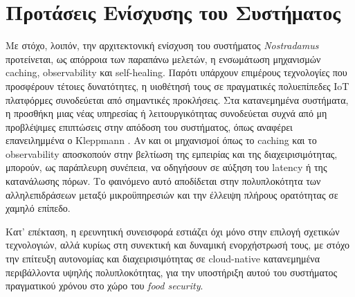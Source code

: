 \section{Προτάσεις Ενίσχυσης του Συστήματος}

Με στόχο, λοιπόν, την αρχιτεκτονική ενίσχυση του συστήματος \textit{Nostradamus} προτείνεται, ως απόρροια των παραπάνω μελετών, η ενσωμάτωση μηχανισμών caching, observability και self-healing. Παρότι υπάρχουν επιμέρους τεχνολογίες που προσφέρουν τέτοιες δυνατότητες, η υιοθέτησή τους σε πραγματικές πολυεπίπεδες IoT πλατφόρμες συνοδεύεται από σημαντικές προκλήσεις. Στα κατανεμημένα συστήματα, η προσθήκη μιας νέας υπηρεσίας ή λειτουργικότητας συνοδεύεται συχνά από μη προβλέψιμες επιπτώσεις στην απόδοση του συστήματος, όπως αναφέρει επανειλημμένα ο Kleppmann \cite{kleppmanndda}. Αν και οι μηχανισμοί όπως το caching και το observability αποσκοπούν στην βελτίωση της εμπειρίας και της διαχειρισιμότητας, μπορούν, ως παράπλευρη συνέπεια, να οδηγήσουν σε αύξηση του latency ή της κατανάλωσης πόρων. Το φαινόμενο αυτό αποδίδεται στην πολυπλοκότητα των αλληλεπιδράσεων μεταξύ μικροϋπηρεσιών και την έλλειψη πλήρους ορατότητας σε χαμηλό επίπεδο.

Κατ’ επέκταση, η ερευνητική συνεισφορά εστιάζει όχι μόνο στην επιλογή σχετικών τεχνολογιών, αλλά κυρίως στη συνεκτική και δυναμική ενορχήστρωσή τους, με στόχο την επίτευξη αυτονομίας και διαχειρισιμότητας σε cloud-native κατανεμημένα περιβάλλοντα υψηλής πολυπλοκότητας, για την υποστήριξη αυτού του συστήματος πραγματικού χρόνου στο χώρο του \textit{food security}.
